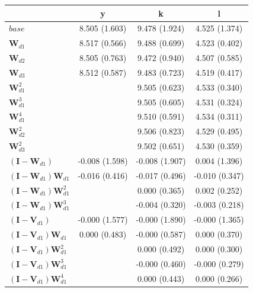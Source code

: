 \begin{tabular}{lccc}
	\toprule\toprule
	~ & y & k & l \\[0.8em]
	\midrule
	$base$ & 8.505
(1.603) & 9.478
(1.924) & 4.525
(1.374) \\[0.9em]
	$\mathbf{W}_{d1}$ & 8.517
(0.566) & 9.488
(0.699) & 4.523
(0.402) \\[0.9em]
	$\mathbf{W}_{d2}$ & 8.505
(0.763) & 9.472
(0.940) & 4.507
(0.585) \\[0.9em]
	$\mathbf{W}_{d3}$ & 8.512
(0.587) & 9.483
(0.723) & 4.519
(0.417) \\[0.9em]
	$\mathbf{W}^{2}_{d1}$ & ~ & 9.505
(0.623) & 4.533
(0.340) \\[0.9em]
	$\mathbf{W}^{3}_{d1}$ & ~ & 9.505
(0.605) & 4.531
(0.324) \\[0.9em]
	$\mathbf{W}^{4}_{d1}$ & ~ & 9.510
(0.591) & 4.534
(0.311) \\[0.9em]
	$\mathbf{W}^{2}_{d2}$ & ~ & 9.506
(0.823) & 4.529
(0.495) \\[0.9em]
	$\mathbf{W}^{2}_{d3}$ & ~ & 9.502
(0.651) & 4.530
(0.359) \\[0.9em]
	$(\mathbf{I} - \mathbf{W}_{d1})$ & -0.008
(1.598) & -0.008
(1.907) & 0.004
(1.396) \\[0.9em]
	$(\mathbf{I} - \mathbf{W}_{d1})\mathbf{W}_{d1}$ & -0.016
(0.416) & -0.017
(0.496) & -0.010
(0.347) \\[0.9em]
	$(\mathbf{I} - \mathbf{W}_{d1})\mathbf{W}^{2}_{d1}$ & ~ & 0.000
(0.365) & 0.002
(0.252) \\[0.9em]
	$(\mathbf{I} - \mathbf{W}_{d1})\mathbf{W}^{3}_{d1}$ & ~ & -0.004
(0.320) & -0.003
(0.218) \\[0.9em]
	$(\mathbf{I} - \mathbf{V}_{d1})$ & -0.000
(1.577) & -0.000
(1.890) & -0.000
(1.365) \\[0.9em]
	$(\mathbf{I} - \mathbf{V}_{d1})\mathbf{W}_{d1}$ & 0.000
(0.483) & -0.000
(0.587) & 0.000
(0.370) \\[0.9em]
	$(\mathbf{I} - \mathbf{V}_{d1})\mathbf{W}^{2}_{d1}$ & ~ & 0.000
(0.492) & 0.000
(0.300) \\[0.9em]
	$(\mathbf{I} - \mathbf{V}_{d1})\mathbf{W}^{3}_{d1}$ & ~ & -0.000
(0.460) & -0.000
(0.279) \\[0.9em]
	$(\mathbf{I} - \mathbf{V}_{d1})\mathbf{W}^{4}_{d1}$ & ~ & 0.000
(0.443) & 0.000
(0.266) \\[0.9em]
	\bottomrule
\end{tabular}
